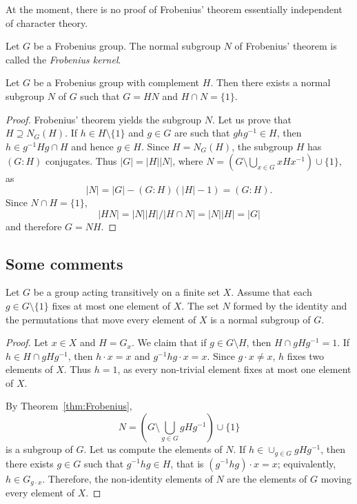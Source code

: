 At the moment, there is no proof of Frobenius' theorem essentially 
independent of character theory. 

\begin{definition}
  Let $G$ be a Frobenius group. The normal subgroup 
  $N$ of Frobenius' theorem is called the \emph{Frobenius kernel}. 
\end{definition}

\begin{corollary}
  Let $G$ be a Frobenius group with complement $H$. 
  Then there exists a normal subgroup $N$ of $G$ 
  such that 
  $G=HN$ and $H\cap N=\{1\}$.
\end{corollary}

\begin{proof}
  Frobenius' theorem yields the subgroup $N$. 
  Let us prove that $H\supseteq N_G(H)$. If $h\in
  H\setminus\{1\}$ and $g\in G$ are such that $ghg^{-1}\in H$, then $h\in
  g^{-1}Hg\cap H$ and hence $g\in H$. Since $H=N_G(H)$, the subgroup $H$
  has $(G:H)$ conjugates. Thus $|G|=|H||N|$,
  where $N=\left( G\setminus\bigcup_{x\in G}xHx^{-1}\right)\cup\{1\}$, as 
  \[
    |N|=|G|-(G:H)(|H|-1)=(G:H).
  \]
  Since $N\cap H=\{1\}$, 
  \[
  |HN|=|N||H|/|H\cap N|=|N||H|=|G|
  \]
  and therefore $G=NH$.
\end{proof}

\subsection*{Some comments}

\begin{corollary}
    \label{cor:Frobenius_combinatorio}
    Let $G$ be a group acting transitively on a finite set $X$. 
    Assume that each $g\in G\setminus\{1\}$ fixes 
    at most one element of 
     $X$. The set $N$ formed by the identity and 
     the permutations that move every element of $X$
     is a normal subgroup of $G$.
\end{corollary}

\begin{proof}
  Let $x\in X$ and $H=G_x$. We claim that 
  if $g\in G\setminus H$, then $H\cap
  gHg^{-1}=1$. If $h\in H\cap gHg^{-1}$, then
  $h\cdot x=x$ and $g^{-1}hg\cdot
  x=x$. Since $g\cdot x\ne x$, $h$ fixes two elements of
  $X$. Thus 
  $h=1$, as every non-trivial element fixes at most one element of $X$. 

  By Theorem~\ref{thm:Frobenius}, 
  \[
    N=\left(G\setminus\bigcup_{g\in G}gHg^{-1}\right)\cup\{1\}
  \]
  is a subgroup of $G$. Let us compute the elements of $N$. If 
  $h\in\cup_{g\in G}gHg^{-1}$, then there exists  $g\in G$ such that $g^{-1}hg\in H$,
  that is $(g^{-1}hg)\cdot x=x$; equivalently, 
  $h\in G_{g\cdot x}$. Therefore, the 
  non-identity elements of $N$ are the elements of $G$
  moving every element of $X$.
\end{proof}

